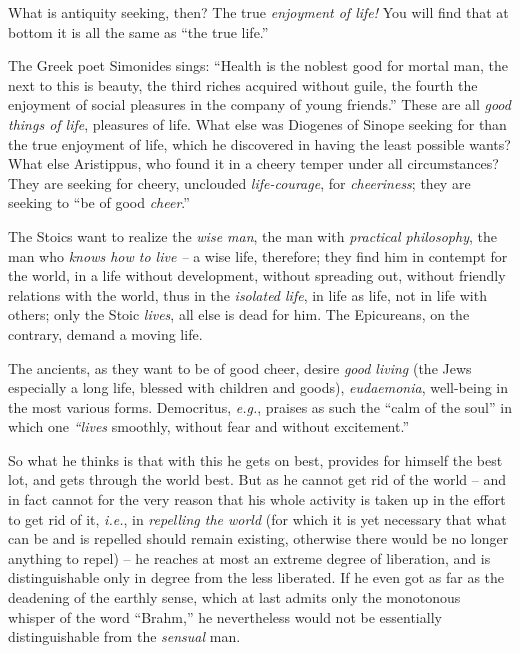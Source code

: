 What is antiquity seeking, then? The true \textit{enjoyment of life!} You will 
find that at bottom it is all the same as ``the true life.''

The Greek poet Simonides sings: ``Health is the noblest good for mortal man, 
the next to this is beauty, the third riches acquired without guile, the 
fourth the enjoyment of social pleasures in the company of young friends.'' 
These are all \textit{good things of life}, pleasures of life. What else was 
Diogenes of Sinope seeking for than the true enjoyment of life, which he 
discovered in having the least possible wants? What else Aristippus, who found 
it in a cheery temper under all circumstances? They are seeking for cheery, 
unclouded \textit{life-courage}, for \textit{cheeriness}; they are seeking to 
``be of good \textit{cheer}.''

The Stoics want to realize the \textit{wise man}, the man with 
\textit{practical philosophy}, the man who \textit{knows how to live --} a 
wise life, therefore; they find him in contempt for the world, in a life 
without development, without spreading out, without friendly relations with 
the world, thus in the \textit{isolated life}, in life as life, not in life 
with others; only the Stoic \textit{lives}, all else is dead for him. The 
Epicureans, on the contrary, demand a moving life.

The ancients, as they want to be of good cheer, desire \textit{good living} 
(the Jews especially a long life, blessed with children and goods), 
\textit{eudaemonia}, well-being in the most various forms. Democritus, 
\textit{e.g.}, praises as such the ``calm of the soul'' in which one 
\textit{``lives} smoothly, without fear and without excitement.''

So what he thinks is that with this he gets on best, provides for himself the 
best lot, and gets through the world best. But as he cannot get rid of the 
world -- and in fact cannot for the very reason that his whole activity is 
taken up in the effort to get rid of it, \textit{i.e.}, in \textit{repelling 
the world} (for which it is yet necessary that what can be and is repelled 
should remain existing, otherwise there would be no longer anything to repel) 
-- he reaches at most an extreme degree of liberation, and is distinguishable 
only in degree from the less liberated. If he even got as far as the deadening 
of the earthly sense, which at last admits only the monotonous whisper of the 
word ``Brahm,'' he nevertheless would not be essentially distinguishable 
from the \textit{sensual} man.


